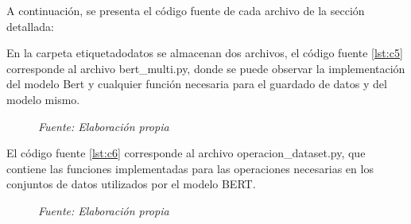 A continuación, se presenta el código fuente de cada archivo de la sección detallada:


En la carpeta etiquetadodatos se almacenan dos archivos, el código fuente \ref{lst:c5} corresponde al archivo bert\_multi.py, donde se puede observar la implementación del modelo Bert y cualquier función necesaria para el guardado de datos y del modelo mismo.


\vspace{-1.3em} %

\begin{figure}[h!]
	\centering %
	\textit{Fuente: Elaboración propia}
\end{figure}

El código fuente \ref{lst:c6} corresponde al archivo operacion\_dataset.py, que contiene las funciones implementadas para las operaciones necesarias en los conjuntos de datos utilizados por el modelo BERT.



\vspace{-1.3em} %

\begin{figure}[h!]
	\centering %
	\textit{Fuente: Elaboración propia}
\end{figure}